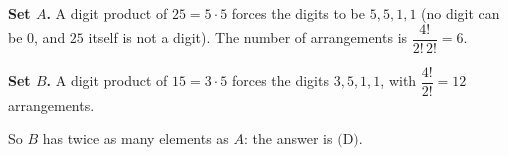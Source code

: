 \textbf{Set $A$.} A digit product of $25=5\cdot5$ forces the digits to be $5,5,1,1$ (no digit can be $0$, and $25$ itself is not a digit). The number of arrangements is $\dfrac{4!}{2!\,2!}=6$.

\textbf{Set $B$.} A digit product of $15=3\cdot5$ forces the digits $3,5,1,1$, with $\dfrac{4!}{2!}=12$ arrangements.

So $B$ has twice as many elements as $A$: the answer is $\boxed{\text{(D)}}$.
